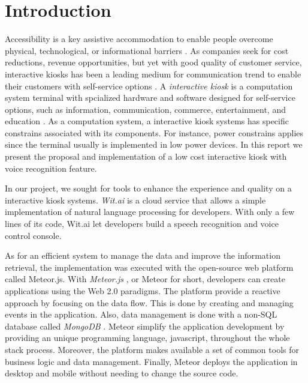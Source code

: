 %
\chapter{Introduction}
\label{sec:intro}


Accessibility is a key assistive accommodation to enable people  overcome physical, technological, or informational barriers \cite{acessguide13}.
As companies seek for cost reductions, revenue opportunities, but yet with good quality of customer service, interactive kiosks has been a leading  medium for communication trend to enable their customers with self-service options \cite{abi16}.
A \emph{interactive kiosk} is a computation system terminal with spcialized hardware and software designed for self-service options, such as information, communication, commerce, entertainment, and education \cite{satish2012money}.
As a computation system, a interactive kiosk systems has specific constrains associated with its components.
For instance, power constrains applies since the terminal usually is implemented in low power devices.
In this report we present the proposal and implementation of a low cost interactive kiosk with voice recognition feature.


In our project, we sought for tools to enhance the experience and quality on a interactive kiosk systems.
\emph{Wit.ai} \cite{1_wit.ai_2016} is a cloud service that allows a simple implementation of natural language processing for developers.
With only a few lines of its code, Wit.ai let developers build a speech recognition and voice control console.


As for an efficient system to manage the data and improve the information retrieval, the implementation was executed with the open-source web platform called Meteor.js.
With \emph{Meteor.js} \cite{meteor}, or Meteor for short, developers can create applications using the Web 2.0 paradigms.
The platform provide a reactive approach by focusing on the data flow.
This is done by creating and managing events in the application.
Also, data management is done with a non-SQL database called \emph{MongoDB} \cite{mongo}.
Meteor simplify the application development by providing an unique programming language, javascript, throughout the whole stack process.
Moreover, the platform makes available a set of common tools for business logic and data management.
Finally, Meteor deploys the application in desktop and mobile without needing to change the source code.


